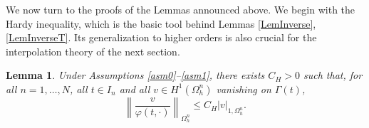 \documentclass[11pt,a4paper]{article}
\theoremstyle{plain}
\newtheorem{lemma}[theorem]{Lemma}%
\theoremstyle{definition}
\theoremstyle{remark}
\numberwithin{equation}{section}
\begin{document}
We now turn to the proofs of the Lemmas announced above. We begin with the Hardy inequality, which is the basic tool behind Lemmas \ref{LemInverse}, \ref{LemInverseT}.  Its generalization to higher orders is also crucial for the interpolation theory of the next section. %

\begin{lemma}\label{LemHardy}
{Under Assumptions \ref{asm0}--\ref{asm1}, there exists $C_H>0$ such that, for all $n=1,\ldots,N$, all $t\in I_n$ and all $v\in H^1(\Omega_h^n)$ vanishing on $\Gamma(t)$,}
\begin{equation}\label{Hardy}
	{\left\| \frac{v}{\varphi(t,\cdot)} \right\|_{\Omega_h^n} \leqslant C_H |v|_{1,\Omega_h^n}  .}
\end{equation}
\end{lemma}
\end{document}
